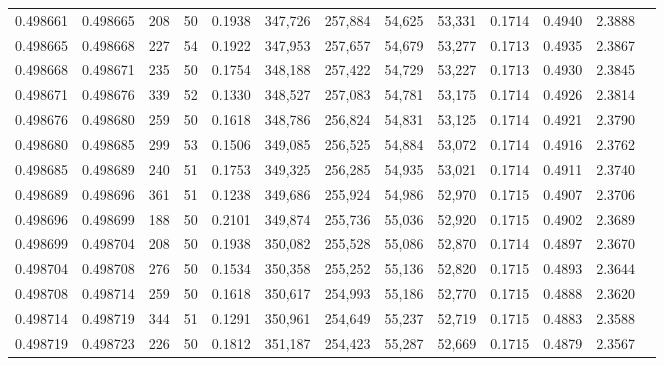\begin{tabular}{rrrrrrrrrrrrr}
0.498661 & 0.498665 & 208 &  50 &                                     0.1938 & 347,726 & 257,884 &  54,625 &  53,331 & 0.1714 & 0.4940 & 2.3888 \\
0.498665 & 0.498668 & 227 &  54 &                                     0.1922 & 347,953 & 257,657 &  54,679 &  53,277 & 0.1713 & 0.4935 & 2.3867 \\
0.498668 & 0.498671 & 235 &  50 &                                     0.1754 & 348,188 & 257,422 &  54,729 &  53,227 & 0.1713 & 0.4930 & 2.3845 \\
0.498671 & 0.498676 & 339 &  52 &                                     0.1330 & 348,527 & 257,083 &  54,781 &  53,175 & 0.1714 & 0.4926 & 2.3814 \\
0.498676 & 0.498680 & 259 &  50 &                                     0.1618 & 348,786 & 256,824 &  54,831 &  53,125 & 0.1714 & 0.4921 & 2.3790 \\
0.498680 & 0.498685 & 299 &  53 &                                     0.1506 & 349,085 & 256,525 &  54,884 &  53,072 & 0.1714 & 0.4916 & 2.3762 \\
0.498685 & 0.498689 & 240 &  51 &                                     0.1753 & 349,325 & 256,285 &  54,935 &  53,021 & 0.1714 & 0.4911 & 2.3740 \\
0.498689 & 0.498696 & 361 &  51 &                                     0.1238 & 349,686 & 255,924 &  54,986 &  52,970 & 0.1715 & 0.4907 & 2.3706 \\
0.498696 & 0.498699 & 188 &  50 &                                     0.2101 & 349,874 & 255,736 &  55,036 &  52,920 & 0.1715 & 0.4902 & 2.3689 \\
0.498699 & 0.498704 & 208 &  50 &                                     0.1938 & 350,082 & 255,528 &  55,086 &  52,870 & 0.1714 & 0.4897 & 2.3670 \\
0.498704 & 0.498708 & 276 &  50 &                                     0.1534 & 350,358 & 255,252 &  55,136 &  52,820 & 0.1715 & 0.4893 & 2.3644 \\
0.498708 & 0.498714 & 259 &  50 &                                     0.1618 & 350,617 & 254,993 &  55,186 &  52,770 & 0.1715 & 0.4888 & 2.3620 \\
0.498714 & 0.498719 & 344 &  51 &                                     0.1291 & 350,961 & 254,649 &  55,237 &  52,719 & 0.1715 & 0.4883 & 2.3588 \\
0.498719 & 0.498723 & 226 &  50 &                                     0.1812 & 351,187 & 254,423 &  55,287 &  52,669 & 0.1715 & 0.4879 & 2.3567 \\

\end{tabular}

